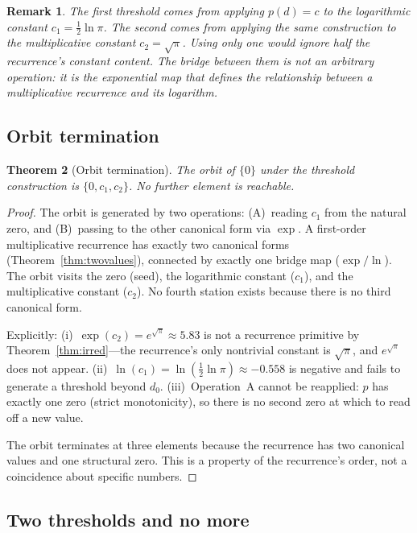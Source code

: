 \documentclass[11pt,a4paper]{article}
\newtheorem{theorem}{Theorem}[section]
\newtheorem{remark}[theorem]{Remark}
\begin{document}
\begin{remark}
The first threshold comes from applying $p(d) = c$ to the logarithmic
constant $c_1 = \frac{1}{2}\ln\pi$. The second comes from applying the
same construction to the multiplicative constant $c_2 = \sqrt{\pi}$.
Using only one would ignore half the recurrence's constant content. The
bridge between them is not an arbitrary operation: it is the exponential
map that defines the relationship between a multiplicative recurrence and
its logarithm.
\end{remark}

\subsection{Orbit termination}

\begin{theorem}[Orbit termination]\label{thm:terminate}
The orbit of $\{0\}$ under the threshold construction is
$\{0, c_1, c_2\}$. No further element is reachable.
\end{theorem}

\begin{proof}
The orbit is generated by two operations: (A)~reading $c_1$ from the
natural zero, and (B)~passing to the other canonical form via $\exp$.
A first-order multiplicative recurrence has exactly two canonical forms
(Theorem~\ref{thm:twovalues}), connected by exactly one bridge map
($\exp/\ln$). The orbit visits the zero (seed), the logarithmic constant
($c_1$), and the multiplicative constant ($c_2$). No fourth station
exists because there is no third canonical form.

Explicitly: (i)~$\exp(c_2) = e^{\sqrt{\pi}}\approx 5.83$ is not a
recurrence primitive by Theorem~\ref{thm:irred}---the recurrence's
only nontrivial constant is $\sqrt{\pi}$, and $e^{\sqrt{\pi}}$ does not
appear. (ii)~$\ln(c_1) = \ln(\frac{1}{2}\ln\pi) \approx -0.558$ is
negative and fails to generate a threshold beyond $d_0$.
(iii)~Operation~A cannot be reapplied: $p$ has exactly one zero (strict
monotonicity), so there is no second zero at which to read off a new
value.

The orbit terminates at three elements because the recurrence has two
canonical values and one structural zero. This is a property of the
recurrence's order, not a coincidence about specific numbers.
\end{proof}

\subsection{Two thresholds and no more}
\end{document}
